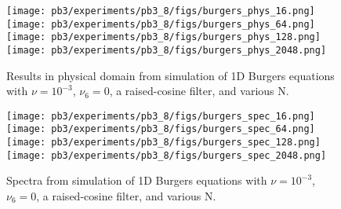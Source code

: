 \documentclass[11pt]{article}
\begin{document}
\begin{enumerate}
    \begin{figure}[ht]
    \begin{center}
    \texttt{[image: pb3/experiments/pb3\_8/figs/burgers\_phys\_16.png]} 
    \texttt{[image: pb3/experiments/pb3\_8/figs/burgers\_phys\_64.png]}\\
    \texttt{[image: pb3/experiments/pb3\_8/figs/burgers\_phys\_128.png]}
    \texttt{[image: pb3/experiments/pb3\_8/figs/burgers\_phys\_2048.png]}
    \end{center}
    \caption{Results in physical domain from simulation of 1D Burgers equations with $\nu = 10^{-3}$, $\nu_6=0$, a raised-cosine filter, and various N.}
    \label{fig:pb3_8_phys}
    \end{figure}


    \begin{figure}[ht]
    \begin{center}
    \texttt{[image: pb3/experiments/pb3\_8/figs/burgers\_spec\_16.png]} 
    \texttt{[image: pb3/experiments/pb3\_8/figs/burgers\_spec\_64.png]}\\
    \texttt{[image: pb3/experiments/pb3\_8/figs/burgers\_spec\_128.png]}
    \texttt{[image: pb3/experiments/pb3\_8/figs/burgers\_spec\_2048.png]}
    \end{center}
    \caption{Spectra from simulation of 1D Burgers equations with $\nu = 10^{-3}$, $\nu_6=0$, a raised-cosine filter, and various N.}
    \label{fig:pb3_8_spec}

    \end{figure}


\end{enumerate}
\end{document}
